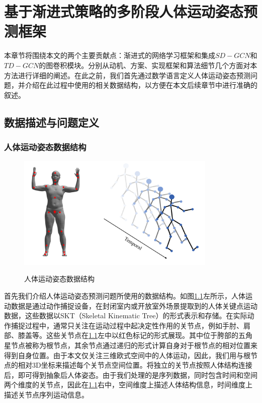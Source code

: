 
\chapter{基于渐进式策略的多阶段人体运动姿态预测框架}\label{chapter-5}
本章节将围绕本文的两个主要贡献点：渐进式的网络学习框架和集成$SD-GCN$和$TD-GCN$的图卷积模块。分别从动机、方案、实现框架和算法细节几个方面对本方法进行详细的阐述。在此之前，我们首先通过数学语言定义人体运动姿态预测问题，并介绍在此过程中使用的相关数据结构，以方便在本文后续章节中进行准确的叙述。
\section{数据描述与问题定义}
\subsection{人体运动姿态数据结构}
\begin{figure}[ht]
    \centering
    \includegraphics[width=0.85\textwidth]{FigMa/show_structure.png}\\
    \vspace{-0.3cm}
    \caption{人体运动姿态数据结构}
    \label{fig:data_structure}
\end{figure}
首先我们介绍人体运动姿态预测问题所使用的数据结构。如图\ref{fig:data_structure}左所示，人体运动数据是通过动作捕捉设备，在封闭室内或开放室外场景提取到的人体关键点运动数据，这些数据以SKT（Skeletal Kinematic Tree）的形式表示和存储。在实际动作捕捉过程中，通常只关注在运动过程中起决定性作用的关节点，例如手肘、肩部、膝盖等。这些关节点在\ref{fig:data_structure}左中以红色标记的形式展现。其中位于胯部的五角星节点被称为根节点，其余节点通过递归的形式计算自身对于根节点的相对位置来得到自身位置。由于本文仅关注三维欧式空间中的人体运动，因此，我们用与根节点的相对3D坐标来描述每个关节点空间位置。将独立的关节点按照人体结构连接后，即可得到抽象后人体姿态。由于我们处理的是序列数据，同时包含时间和空间两个维度的关节点，因此在\ref{fig:data_structure}右中，空间维度上描述人体结构信息，时间维度上描述关节点序列运动信息。

